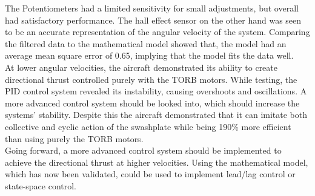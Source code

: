     The Potentiometers had a limited sensitivity for small adjustments, but overall had satisfactory performance. The hall effect sensor on the other hand was seen to be an accurate representation of the angular velocity of the system.  Comparing the filtered data to the mathematical model showed that, the model had an average mean square error of 0.65, implying that the model fits the data well. \\
    At lower angular velocities, the aircraft demonstrated its ability to create directional thrust controlled purely with the TORB motors. While testing, the PID control system revealed its instability, causing overshoots and oscillations. A more advanced control system should be looked into, which should increase the systems' stability. Despite this the aircraft demonstrated that it can imitate both collective and cyclic action of the swashplate while being 190\% more efficient than using purely the TORB motors.\\
    
    Going forward, a more advanced control system should be implemented to achieve the directional thrust at higher velocities. Using the mathematical model, which has now been validated, could be used to implement lead/lag control or state-space control.
    